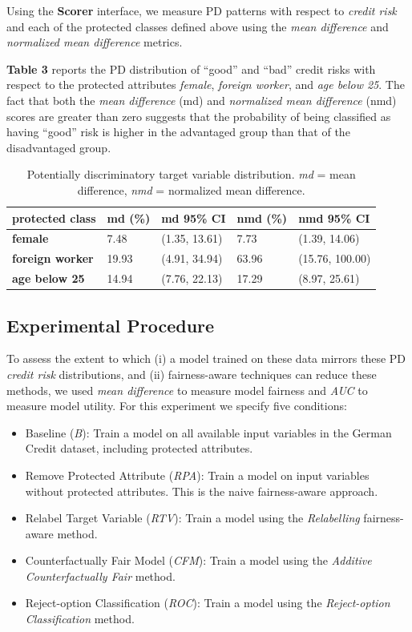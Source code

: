 \documentclass{{interact/interact}}
\begin{document}
Using the \textbf{Scorer} interface, we measure PD patterns with respect to
\emph{credit risk} and each of the protected classes defined above using the
\emph{mean difference} and \emph{normalized mean difference} metrics.

\textbf{Table 3} reports the PD distribution of ``good'' and ``bad'' credit
risks with respect to the protected attributes \emph{female}, \emph{foreign
worker}, and \emph{age below 25}. The fact that both the \emph{mean difference}
(md) and \emph{normalized mean difference} (nmd) scores are greater than zero
suggests that the probability of being classified as having ``good'' risk is
higher in the advantaged group than that of the disadvantaged group.

\begin{table}
  \caption{Potentially discriminatory target variable distribution.
    \emph{md} = mean difference, \emph{nmd} = normalized mean difference.}
  \renewcommand{\arraystretch}{1.75}
  \small\noindent\begin{tabularx}{\linewidth}{l|X|X|X|X}
    \textbf{protected class} & \textbf{md (\%)} & \textbf{md 95\% CI} &
      \textbf{nmd (\%)} & \textbf{nmd 95\% CI}\\
    \hline
    \textbf{female} & 7.48 & (1.35, 13.61) & 7.73 & (1.39, 14.06) \\
    \textbf{foreign worker} & 19.93 & (4.91, 34.94) & 63.96 & (15.76, 100.00)\\
    \textbf{age below 25} & 14.94 & (7.76, 22.13) & 17.29 & (8.97, 25.61)\\
  \end{tabularx}
\end{table}

\subsection{Experimental Procedure}

To assess the extent to which (i) a model trained on these data mirrors these PD
\emph{credit risk} distributions, and (ii) fairness-aware techniques can reduce
these methods, we used \emph{mean difference} to measure model fairness and
\emph{AUC} to measure model utility. For this experiment we specify five
conditions:

\begin{itemize}
  \item Baseline (\emph{B}): Train a model on all available input variables in
        the German Credit dataset, including protected attributes.
  \item Remove Protected Attribute (\emph{RPA}): Train a model on input variables
        without protected attributes. This is the naive fairness-aware approach.
  \item Relabel Target Variable (\emph{RTV}): Train a model using the
        \emph{Relabelling} fairness-aware method.
  \item Counterfactually Fair Model (\emph{CFM}): Train a model using the
        \emph{Additive Counterfactually Fair} method.
  \item Reject-option Classification (\emph{ROC}): Train a model using the
        \emph{Reject-option Classification} method.
\end{itemize}
\end{document}
